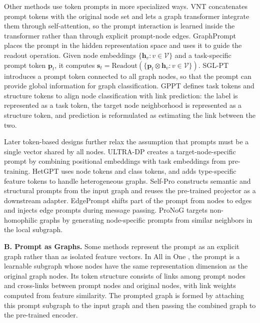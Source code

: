 Other methods use token prompts in more specialized ways. VNT \cite{tan2023virtual} concatenates prompt tokens with the original node set and lets a graph transformer integrate them through self-attention, so the prompt interaction is learned inside the transformer rather than through explicit prompt-node edges. GraphPrompt \cite{liu2023graphprompt} places the prompt in the hidden representation space and uses it to guide the readout operation. Given node embeddings $\{\textbf{h}_v:v\in\mathcal{V}\}$ and a task-specific prompt token $\textbf{p}_t$, it computes $\textbf{s}_t=\text{Readout}(\{\textbf{p}_t \otimes \textbf{h}_v:v \in \mathcal{V}\})$. SGL-PT \cite{zhu2023sglpt} introduces a prompt token connected to all graph nodes, so that the prompt can provide global information for graph classification. GPPT \cite{sun2022gppt} defines task tokens and structure tokens to align node classification with link prediction: the label is represented as a task token, the target node neighborhood is represented as a structure token, and prediction is reformulated as estimating the link between the two.

Later token-based designs further relax the assumption that prompts must be a single vector shared by all nodes. ULTRA-DP \cite{chen2023ultradp} creates a target-node-specific prompt by combining positional embeddings with task embeddings from pre-training. HetGPT \cite{ma2023hetgpt} uses node tokens and class tokens, and adds type-specific feature tokens to handle heterogeneous graphs. Self-Pro \cite{gong2024selfpro} constructs semantic and structural prompts from the input graph and reuses the pre-trained projector as a downstream adapter. EdgePrompt \cite{fu2025edge} shifts part of the prompt from nodes to edges and injects edge prompts during message passing. ProNoG \cite{yu2025pronog} targets non-homophilic graphs by generating node-specific prompts from similar neighbors in the local subgraph.




\textbf{B. Prompt as Graphs. }
Some methods represent the prompt as an explicit graph rather than as isolated feature vectors. In All in One \cite{sun2023all}, the prompt is a learnable subgraph whose nodes have the same representation dimension as the original graph nodes. Its token structure consists of links among prompt nodes and cross-links between prompt nodes and original nodes, with link weights computed from feature similarity. The prompted graph is formed by attaching this prompt subgraph to the input graph and then passing the combined graph to the pre-trained encoder.

